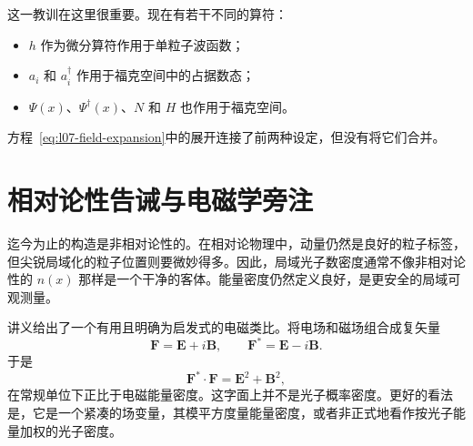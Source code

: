 这一教训在这里很重要。现在有若干不同的算符：
\begin{itemize}
\item \(h\) 作为微分算符作用于单粒子波函数；
\item \(a_i\) 和 \(a_i^\dagger\) 作用于福克空间中的占据数态；
\item \(\Psi(x)\)、\(\Psi^\dagger(x)\)、\(N\) 和 \(H\) 也作用于福克空间。
\end{itemize}
方程~\eqref{eq:l07-field-expansion}中的展开连接了前两种设定，但没有将它们合并。

\begin{classroomqa}
\end{classroomqa}

\section{相对论性告诫与电磁学旁注}

迄今为止的构造是非相对论性的。在相对论物理中，动量仍然是良好的粒子标签，但尖锐局域化的粒子位置则要微妙得多。因此，局域光子数密度通常不像非相对论性的 \(n(x)\) 那样是一个干净的客体。能量密度仍然定义良好，是更安全的局域可观测量。

讲义给出了一个有用且明确为启发式的电磁类比。将电场和磁场组合成复矢量
\begin{equation}
\mathbf F=\mathbf E+i\mathbf B,
\qquad
\mathbf F^*=\mathbf E-i\mathbf B.
\label{eq:l07-riemann-silberstein}
\end{equation}
于是
\begin{equation}
\mathbf F^*\mathbin{\cdot}\mathbf F
=\mathbf E^2+\mathbf B^2,
\label{eq:l07-em-density}
\end{equation}
在常规单位下正比于电磁能量密度。这字面上并不是光子概率密度。更好的看法是，它是一个紧凑的场变量，其模平方度量能量密度，或者非正式地看作按光子能量加权的光子密度。

\begin{classroomqa}
\end{classroomqa}

